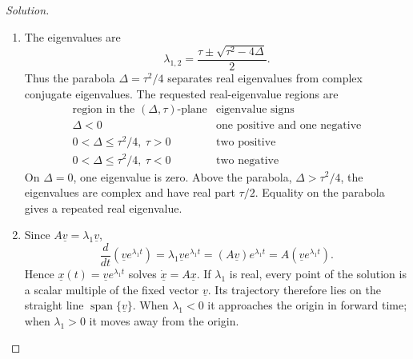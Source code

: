 \documentclass[12pt]{amsart}
\theoremstyle{conjecture}
\theoremstyle{definition}
\theoremstyle{question}
\theoremstyle{theorem}
\newenvironment{solution}
{\begin{proof}[Solution]}
{\end{proof}}
\newcommand{\vct}[1]{\underline{#1}}
\begin{document}
\begin{solution}
\begin{enumerate}
            \item[(d)] The eigenvalues are
            \[
                \lambda_{1,2}=\frac{\tau\pm\sqrt{\tau^2-4\Delta}}{2}.
            \]
            Thus the parabola $\Delta=\tau^2/4$ separates real eigenvalues from
            complex conjugate eigenvalues. The requested real-eigenvalue regions are
            \[
                \begin{array}{c|c}
                    \text{region in the }(\Delta,\tau)\text{-plane}&\text{eigenvalue signs}\\ \hline
                    \Delta<0&\text{one positive and one negative}\\
                    0<\Delta\leq \tau^2/4,\ \tau>0&\text{two positive}\\
                    0<\Delta\leq \tau^2/4,\ \tau<0&\text{two negative}
                \end{array}
            \]
            On $\Delta=0$, one eigenvalue is zero. Above the parabola,
            $\Delta>\tau^2/4$, the eigenvalues are complex and have real part
            $\tau/2$. Equality on the parabola gives a repeated real eigenvalue.

            \item[(e)] Since $A\vct{v}=\lambda_1\vct{v}$,
            \[
                \frac{d}{dt}\left(\vct{v}e^{\lambda_1t}\right)
                =\lambda_1\vct{v}e^{\lambda_1t}
                =(A\vct{v})e^{\lambda_1t}
                =A\left(\vct{v}e^{\lambda_1t}\right).
            \]
            Hence $\vct{x}(t)=\vct{v}e^{\lambda_1t}$ solves
            $\dot{\vct{x}}=A\vct{x}$. If $\lambda_1$ is real, every point of the
            solution is a scalar multiple of the fixed vector $\vct{v}$. Its trajectory
            therefore lies on the straight line $\operatorname{span}\{\vct{v}\}$.
            When $\lambda_1<0$ it approaches the origin in forward time; when
            $\lambda_1>0$ it moves away from the origin.


\end{enumerate}
\end{solution}
\end{document}
